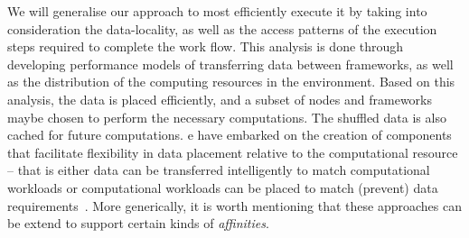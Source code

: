 \documentclass[3p,twocolumn]{elsarticle}
\begin{document}
We will generalise our approach to most efficiently execute it by
taking into consideration the data-locality, as well as the access
patterns of the execution steps required to complete the work
flow. This analysis is done through developing performance models of
transferring data between frameworks, as well as the distribution of
the computing resources in the environment. Based on this analysis,
the data is placed efficiently, and a subset of nodes and frameworks
maybe chosen to perform the necessary computations. The shuffled data
is also cached for future computations.  e have embarked on the
creation of components that facilitate flexibility in data placement
relative to the computational resource -- that is either data can be
transferred intelligently to match computational workloads or
computational workloads can be placed to match (prevent) data
requirements~\cite{???}. More generically, it is worth mentioning that
these approaches can be extend to support certain kinds of {\it
  affinities}.




\end{document}

